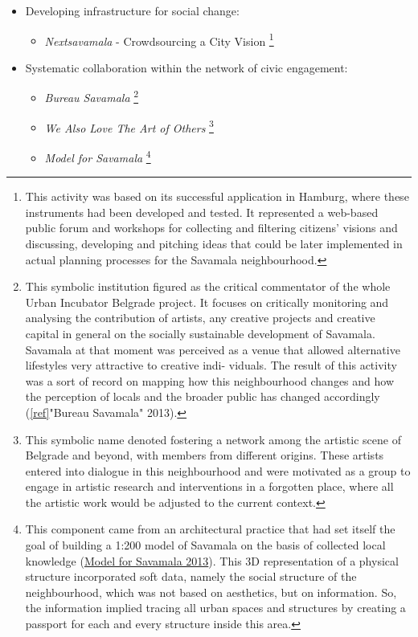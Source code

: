 \documentclass[11pt]{report}
\begin{document}
\begin{itemize}
\item Developing infrastructure for social change:

\begin{itemize}
\item \textit{Nextsavamala} - Crowdsourcing a City Vision
\footnote{This activity was based on its successful application in Hamburg, where these instruments had been developed and tested. It represented a web-based public forum and workshops for collecting and filtering citizens’ visions and discussing, developing and pitching ideas that could be later  implemented in actual planning processes for the Savamala neighbourhood.}
\end{itemize}

\item Systematic collaboration within the network of civic engagement:

\begin{itemize}
\item \textit{Bureau Savamala}
\footnote{This symbolic institution figured as the critical commentator of the whole Urban Incubator Belgrade project. It focuses on critically monitoring and analysing the contribution of artists, any creative projects and creative capital in general on the socially sustainable development of Savamala. Savamala at that moment was perceived as a venue that allowed alternative lifestyles very attractive to creative indi- viduals. The result of this activity was a sort of record on mapping how this neighbourhood changes and how the perception of locals and the broader public has changed accordingly (\ref{ref}{"Bureau Savamala" 2013}).}

\item \textit{We Also Love The Art of Others}
\footnote{This symbolic name denoted fostering a network among the artistic scene of Belgrade and beyond, with members from different origins. These artists entered into dialogue in this neighbourhood and were motivated as a group to engage in artistic research and interventions in a forgotten place, where all the artistic work would be adjusted to the current context.}

\item \textit{Model for Savamala}
\footnote{This component came from an architectural practice that had set itself the goal of building a 1:200 model of Savamala on the basis of collected local knowledge (\href{ref}{Model for Savamala 2013}).
This 3D representation of a physical structure incorporated soft data, namely the social structure of the neighbourhood, which was not based on aesthetics, but on information.
So, the information implied tracing all urban spaces and structures by creating a passport for each and every structure inside this area.}
\end{itemize}


\end{itemize}
\end{document}
